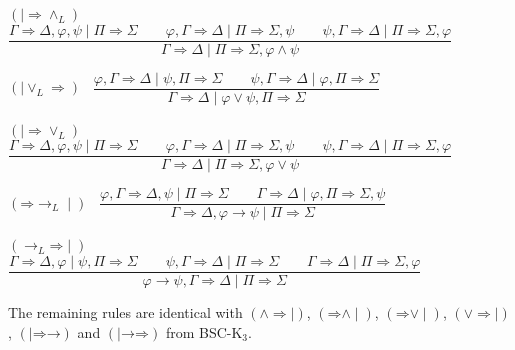 \documentclass[11pt,a4paper,titlepage]{article}
\theoremstyle{definition}
\newcommand{\3}{\vspace{.3in}}
\newcommand{\2}{\vspace{.2in}}
\newcommand{\1}{\vspace{.1in}}
\newcommand{\5}{\vspace{.05in}}
\begin{document}
\begin{flushleft}
	{\footnotesize $(\mid\mathord{\Rightarrow\wedge_L})$ \ $ \dfrac{\Gamma
			\Rightarrow \Delta, \varphi, \psi \mid \Pi\Rightarrow\Sigma \qquad\varphi, \Gamma\Rightarrow\Delta \mid
			\Pi \Rightarrow \Sigma, \psi \qquad \psi, \Gamma\Rightarrow\Delta \mid \Pi\Rightarrow\Sigma, \varphi } {\Gamma
			\Rightarrow \Delta\mid \Pi\Rightarrow\Sigma, \varphi\wedge\psi }$}
\end{flushleft}

\begin{flushleft}
	$(\mathord{\mid\vee_L\Rightarrow})$ \ $\dfrac{\varphi, \Gamma
		\Rightarrow \Delta \mid \psi, \Pi\Rightarrow\Sigma \qquad \psi, \Gamma\Rightarrow\Delta\mid \varphi, \Pi\Rightarrow\Sigma}{\Gamma\Rightarrow\Delta \mid \varphi\vee\psi, \Pi\Rightarrow\Sigma}$
\end{flushleft} 

\begin{flushleft}
	{\footnotesize $(\mathord{\mid\Rightarrow\vee_L})$ \ $\dfrac{\Gamma
			\Rightarrow \Delta, \varphi, \psi \mid \Pi\Rightarrow\Sigma \qquad\varphi,  \Gamma\Rightarrow\Delta \mid
			\Pi \Rightarrow \Sigma, \psi \qquad \psi, \Gamma\Rightarrow\Delta \mid \Pi\Rightarrow\Sigma, \varphi } {\Gamma
			\Rightarrow \Delta \mid \Pi\Rightarrow\Sigma, \varphi\vee\psi}$}
\end{flushleft}

\begin{flushleft}
	$(\mathord{\Rightarrow}\mathord{\rightarrow_L}\mid)$ \ $\dfrac{\varphi, \Gamma
		\Rightarrow \Delta, \psi \mid \Pi\Rightarrow\Sigma \qquad \Gamma\Rightarrow\Delta \mid \varphi, \Pi\Rightarrow\Sigma, \psi}{\Gamma\Rightarrow\Delta, \varphi\rightarrow\psi \mid \Pi\Rightarrow\Sigma}$ 
\end{flushleft}

\begin{flushleft}
	{\small $(\mathord{\rightarrow_L}\mathord{\Rightarrow}\mid)$ \ $\dfrac{\Gamma
			\Rightarrow \Delta, \varphi \mid \psi, \Pi\Rightarrow\Sigma \qquad \psi, \Gamma\Rightarrow\Delta \mid
			\Pi \Rightarrow \Sigma \qquad \Gamma\Rightarrow\Delta \mid \Pi\Rightarrow\Sigma, \varphi } {\varphi\rightarrow\psi, \Gamma
			\Rightarrow \Delta \mid \Pi\Rightarrow\Sigma}$}
\end{flushleft}

The remaining  rules are identical with  $(\mathord{\wedge}\mathord{\Rightarrow\mid})$, $(\mathord{\Rightarrow}\mathord{\wedge\mid})$, $(\mathord{\Rightarrow}\mathord{\vee\mid})$, $(\mathord{\vee}\mathord{\Rightarrow\mid})$, $(\mid\mathord{\Rightarrow}\mathord{\rightarrow})$ and $(\mid\mathord{\rightarrow}\mathord{\Rightarrow})$ from BSC-K$_3$.
\end{document}
